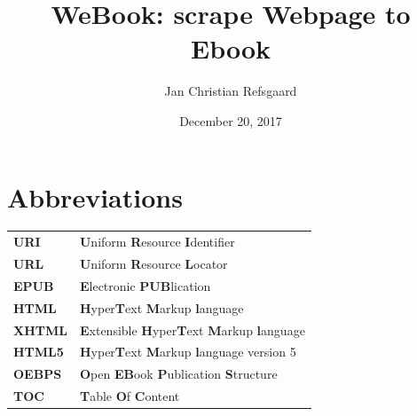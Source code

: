 \documentclass[]{report}   %
\begin{document}
\sloppy

					
\lstset{language=python,upquote=true}
\setlength\parindent{0pt}

\title{WeBook: scrape Webpage to Ebook}
\author{Jan Christian Refsgaard}
\date{December 20, 2017}    %

\maketitle

\tableofcontents

\chapter*{Abbreviations}
\begin{tabular}{ l l }
	\textbf{URI}   & \textbf{U}niform \textbf{R}esource \textbf{I}dentifier \\
	\textbf{URL}   & \textbf{U}niform \textbf{R}esource \textbf{L}ocator \\
	\textbf{EPUB}  & \textbf{E}lectronic \textbf{PUB}lication  \\
	\textbf{HTML}  & \textbf{H}yper\textbf{T}ext \textbf{M}arkup \textbf{l}anguage \\
	\textbf{XHTML} & \textbf{E}xtensible \textbf{H}yper\textbf{T}ext 
					 \textbf{M}arkup \textbf{l}anguage \\
	\textbf{HTML5} & \textbf{H}yper\textbf{T}ext \textbf{M}arkup \textbf{l}anguage 
					 version 5 \\
	\textbf{OEBPS} & \textbf{O}pen \textbf{EB}ook \textbf{P}ublication \textbf{S}tructure \\
	\textbf{TOC}   & \textbf{T}able \textbf{O}f \textbf{C}ontent  \\
\end{tabular}

\end{document}
